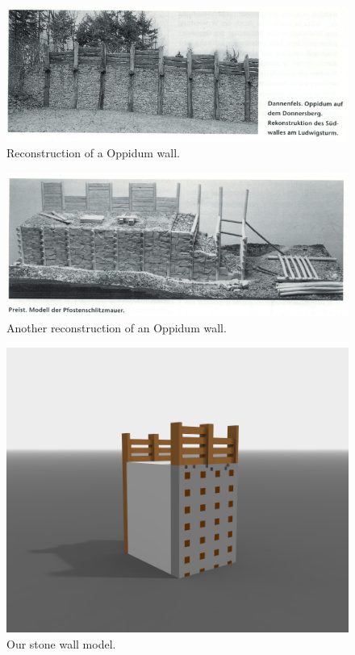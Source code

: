 \begin{figure}[ht]
	\centering
	\includegraphics[width=\linewidth]{pictures/scan_rieckhoff_wall1.png}
	\caption{Reconstruction of a Oppidum wall.}
\end{figure}

\begin{figure}[ht]
	\centering
	\includegraphics[width=\linewidth]{pictures/scan_rieckhoff_wall2.png}
	\caption{Another reconstruction of an Oppidum wall.}
\end{figure}

\begin{figure}[ht]
	\centering
	\includegraphics[width=\linewidth]{pictures/stone_wall.png}
	\caption{Our stone wall model.}
\end{figure}


